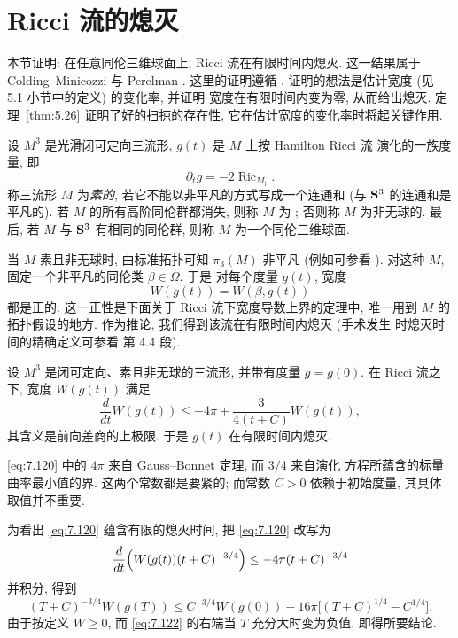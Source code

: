 \section{Ricci 流的熄灭}
\label{sec:7.7}

本节证明: 在任意同伦三维球面上, Ricci 流在有限时间内熄灭. 这一结果属于
Colding--Minicozzi \cite{CM19} 与 Perelman \cite{Pe1}. 这里的证明遵循
\cite{CM19}. 证明的想法是估计宽度 (见 5.1 小节中的定义) 的变化率, 并证明
宽度在有限时间内变为零, 从而给出熄灭. 定理~\ref{thm:5.26} 证明了好的扫掠的存在性,
它在估计宽度的变化率时将起关键作用.

设 $M^3$ 是光滑闭可定向三流形, $g(t)$ 是 $M$ 上按 Hamilton Ricci 流
\cite{Ha1} 演化的一族度量, 即
\begin{equation}
\partial_tg=-2\operatorname{Ric}_{M_t}.
\label{eq:7.119}
\end{equation}
称三流形 $M$ 为\emph{素的}, 若它不能以非平凡的方式写成一个连通和 (与
$\mathbf{S}^3$ 的连通和是平凡的). 若 $M$ 的所有高阶同伦群都消失, 则称 $M$ 为
; 否则称 $M$ 为非无球的. 最后, 若
$M$ 与 $\mathbf{S}^3$ 有相同的同伦群, 则称 $M$ 为一个同伦三维球面.

当 $M$ 素且非无球时, 由标准拓扑可知 $\pi_3(M)$ 非平凡 (例如可参看
\cite{CM19}). 对这种 $M$, 固定一个非平凡的同伦类 $\beta\in\Omega$. 于是
对每个度量 $g(t)$, 宽度
\[
W(g(t))=W(\beta,g(t))
\]
都是正的. 这一正性是下面关于 Ricci 流下宽度导数上界的定理中, 唯一用到
$M$ 的拓扑假设的地方. 作为推论, 我们得到该流在有限时间内熄灭 (手术发生
时熄灭时间的精确定义可参看 \cite{Pe1} 第 4.4 段).

\begin{theorem}
\label{thm:7.19}
设 $M^3$ 是闭可定向、素且非无球的三流形, 并带有度量 $g=g(0)$. 在 Ricci
流之下, 宽度 $W(g(t))$ 满足
\begin{equation}
\frac{d}{dt}W(g(t))\leq-4\pi+\frac3{4(t+C)}W(g(t)),
\label{eq:7.120}
\end{equation}
其含义是前向差商的上极限. 于是 $g(t)$ 在有限时间内熄灭.
\end{theorem}

\eqref{eq:7.120} 中的 $4\pi$ 来自 Gauss--Bonnet 定理, 而 $3/4$ 来自演化
方程所蕴含的标量曲率最小值的界. 这两个常数都是要紧的; 而常数 $C>0$
依赖于初始度量, 其具体取值并不重要.

为看出 \eqref{eq:7.120} 蕴含有限的熄灭时间, 把 \eqref{eq:7.120} 改写为
\begin{equation}
\frac{d}{dt}\Bigl(W(g(t))(t+C)^{-3/4}\Bigr)\leq-4\pi(t+C)^{-3/4}
\label{eq:7.121}
\end{equation}
并积分, 得到
\begin{equation}
(T+C)^{-3/4}W(g(T))\leq C^{-3/4}W(g(0))
-16\pi\bigl[(T+C)^{1/4}-C^{1/4}\bigr].
\label{eq:7.122}
\end{equation}
由于按定义 $W\geq0$, 而 \eqref{eq:7.122} 的右端当 $T$ 充分大时变为负值,
即得所要结论.

